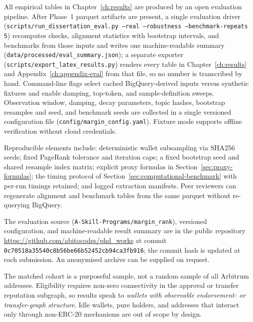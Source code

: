 
All empirical tables in Chapter~\ref{ch:results} are produced by an open evaluation pipeline. After Phase~1 parquet artifacts are present, a single evaluation driver (\texttt{scripts/run\_dissertation\_eval.py --real --robustness --benchmark-repeats 5}) recomputes checks, alignment statistics with bootstrap intervals, and benchmarks from those inputs and writes one machine-readable summary (\texttt{data/processed/eval\_summary.json}); a separate exporter (\texttt{scripts/export\_latex\_results.py}) renders every table in Chapter~\ref{ch:results} and Appendix~\ref{ch:appendix-eval} from that file, so no number is transcribed by hand. Command-line flags select cached BigQuery-derived inputs versus synthetic fixtures and enable damping, top-token, and sample-definition sweeps. Observation window, damping, decay parameters, topic hashes, bootstrap resamples and seed, and benchmark seeds are collected in a single versioned configuration file (\texttt{config/margin\_config.yaml}). Fixture mode supports offline verification without cloud credentials.

Reproducible elements include: deterministic wallet subsampling via SHA256 seeds; fixed PageRank tolerance and iteration caps; a fixed bootstrap seed and shared resample index matrix; explicit proxy formulas in Section~\ref{sec:proxy-formulas}; the timing protocol of Section~\ref{sec:computational-benchmark} with per-run timings retained; and logged extraction manifests. Peer reviewers can regenerate alignment and benchmark tables from the same parquet without re-querying BigQuery.

The evaluation source (\texttt{A-Skill-Programs/margin\_rank}), versioned configuration, and machine-readable result summary are in the public repository \url{https://github.com/abitocodes/phd_works} at commit \texttt{0c70518a35540c8b56be66b52452cb94ca3fb916}; the commit hash is updated at each submission. An anonymised archive can be supplied on request.


The matched cohort is a purposeful sample, not a random sample of all Arbitrum addresses. Eligibility requires non-zero connectivity in the approval or transfer reputation subgraph, so results speak to \emph{wallets with observable endorsement- or transfer-graph structure}. Idle wallets, pure holders, and addresses that interact only through non-ERC-20 mechanisms are out of scope by design.

